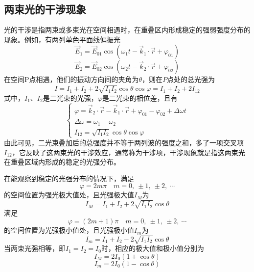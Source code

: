 \documentclass[cn,10pt,chinesefont=founder,math=mtpro2,cite=super,toc=onecol,twoside]{elegantbook}
\begin{document}
\subsection{两束光的干涉现象}
光的干涉是指两束或多束光在空间相遇时，在重叠区内形成稳定的强弱强度分布的现象。例如，有两列单色平面线偏振光
\begin{equation}
\vec{E}_1=\vec{E}_{01}\cos(\omega_1t-\vec{k}_1\cdot\vec{r}+\varphi_{01})
\end{equation}
\begin{equation}
\vec{E}_2=\vec{E}_{02}\cos(\omega_2t-\vec{k}_2\cdot\vec{r}+\varphi_{02})
\end{equation}
在空间P点相遇，他们的振动方向间的夹角为$\theta$，则在$P$点处的总光强为
\begin{equation}
I=I_1+I_2+2\sqrt{I_1I_2}\cos\theta\cos\varphi=I_1+I_2+2I_{12}
\label{eq:two-light-intensity-distribution}
\end{equation}
式中，$I_1$、$I_2$是二光束的光强，$\varphi$是二光束的相位差，且有
\begin{equation}
\begin{cases}
\varphi=\vec{k}_2\cdot\vec{r}-\vec{k}_1\cdot\vec{r}+\varphi_{01}-\varphi_{02}+\Delta\omega t\\
\Delta\omega=\omega_1-\omega_2\\
I_{12}=\sqrt{I_1I_2}\cos\theta\cos\varphi
\end{cases}
\end{equation}
由此可见，二光束叠加后的总强度并不等于两列波的强度之和，多了一项交叉项$I_{12}$，它反映了这两束光的干涉效应，通常称为干涉项，干涉现象就是指这两束光在重叠区域内形成的稳定的光强分布。

在能观察到稳定的光强分布的情况下，满足
\begin{equation}
\varphi=2m\pi\quad m=0,\ \pm1,\ \pm2,\ \cdots
\end{equation}
的空间位置为强光极大值处，且光强极大值$I_M$为
\begin{equation}
I_M=I_1+I_2+2\sqrt{I_1I_2}\cos\theta
\end{equation}
满足
\begin{equation}
\varphi=(2m+1)\pi\quad m=0,\ \pm1,\ \pm2,\ \cdots
\end{equation}
的空间位置为光强极小值处，且光强极小值$I_m$为
\begin{equation}
I_m=I_1+I_2-2\sqrt{I_1I_2}\cos\theta
\end{equation}
当两束光强相等，即$I_1=I_2=I_0$时，相应的极大值和极小值分别为
\begin{equation}
I_M=2I_0(1+\cos\theta)
\label{eq:two-light-intensity-distribution-max}
\end{equation}
\begin{equation}
I_m=2I_0(1-\cos\theta)
\label{eq:two-light-intensity-distribution-min}
\end{equation}
\end{document}
